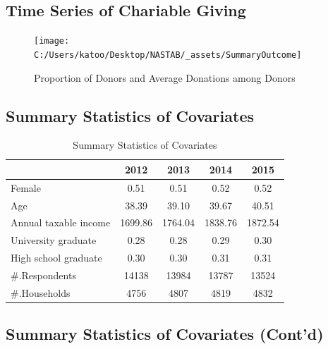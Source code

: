 \documentclass[ review  , 3p ]{elsarticle}
\begin{document}
  \hypertarget{time-series-of-chariable-giving}{%
  \subsection{Time Series of Chariable Giving}\label{time-series-of-chariable-giving}}

  \begin{figure}

  {\centering \texttt{[image: C:/Users/katoo/Desktop/NASTAB/\_assets/SummaryOutcome]} 

  }

  \caption{Proportion of Donors and Average Donations among Donors}\label{fig:unnamed-chunk-1}
  \end{figure}

  \hypertarget{summary-statistics-of-covariates}{%
  \subsection{Summary Statistics of Covariates}\label{summary-statistics-of-covariates}}

  \begin{table}

  \caption{\label{tab:kableSummaryCovariate}Summary Statistics of Covariates}
  \centering
  \begin{tabular}[t]{lcccc}
  \toprule
   & 2012 & 2013 & 2014 & 2015\\
  \midrule
  Female & 0.51 & 0.51 & 0.52 & 0.52\\
  Age & 38.39 & 39.10 & 39.67 & 40.51\\
  Annual taxable income & 1699.86 & 1764.04 & 1838.76 & 1872.54\\
  University graduate & 0.28 & 0.28 & 0.29 & 0.30\\
  High school graduate & 0.30 & 0.30 & 0.31 & 0.31\\
  \#.Respondents & 14138 & 13984 & 13787 & 13524\\
  \#.Households & 4756 & 4807 & 4819 & 4832\\
  \bottomrule
  \end{tabular}
  \end{table}

  \hypertarget{summary-statistics-of-covariates-contd}{%
  \subsection{Summary Statistics of Covariates (Cont'd)}\label{summary-statistics-of-covariates-contd}}
\end{document}
